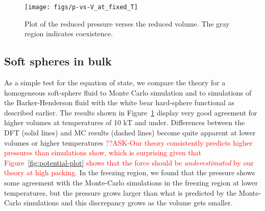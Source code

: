 \documentclass[letterpaper,twocolumn,amsmath,amssymb,prb]{revtex4-1}
\begin{document}
\begin{figure}
 \begin{center}
  \texttt{[image: figs/p-vs-V\_at\_fixed\_T]}
 \end{center}
\caption{Plot of the reduced pressure verses the reduced volume. The gray region indicates coexistence.}
\label{fig:p-vs-V_at_fixed_T}
\end{figure}

\subsection{Soft spheres in bulk}

As a simple test for the equation of state, we compare the theory for
a homogeneous soft-sphere fluid to Monte Carlo simulation and to 
simulations of the Barker-Henderson fluid with the white bear 
hard-sphere functional as described earlier. The results
shown in Figure~\ref{fig:p-vs-V_at_fixed_T} display very good agreement 
for higher volumes at temperatures of 10 kT and under. 
Differences between the DFT (solid lines) and MC results (dashed lines) 
become quite apparent at lower volumes or higher temperatures 
\textcolor{red}{??ASK-Our theory consistently predicts higher pressures than
simulations show, which is surprising given that
Figure~\ref{fig:potential-plot} shows that the force should be
\emph{underestimated} by our theory at high packing.} 
In the freezing region, we found that the pressure shows some 
agreement with the Monte-Carlo simulations in the freezing region 
at lower temperatures, but the pressure grows larger than what is 
predicted by the Monte-Carlo simulations and this
discrepancy grows as the volume gets smaller.
\end{document}
